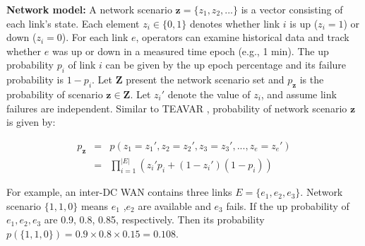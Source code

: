 \documentclass[sigconf]{acmart}
\begin{document}
\textbf{Network  model:} 
A network scenario $\bm{z}=\{z_1,z_2,...\}$ is a vector consisting of each link's state.
Each element $z_i \in \{0,1\}$ denotes whether link  $i$  is up ($z_i=1$) or down  ($z_i=0$).
For each link $e$, operators can examine historical data and track whether $e$ was up or down in a measured time epoch (e.g., 1 min).
The up probability $p_i$ of link $i$ can be given by the up epoch percentage and its failure probability is $1-p_i$.
Let $\bm{Z}$ present the network scenario set and $p_{\bm{z}}$ is the probability of scenario $\bm{z}\in \bm{Z}$.
Let $z_i'$ denote the value of $z_i$, and assume link failures are independent.
Similar to TEAVAR \cite{Teavar},  probability of network scenario  $\bm{z}$ is given by:

\begin{eqnarray} \label{state}
p_{\bm{z}}&=&p\left( z_1=z_1',z_2=z_2',z_3=z_3',...,z_{e}=z_{e}'\right)\nonumber \\
&=&\prod_{i=1}^{|E|}(z_i'p_i+(1-z_i')(1-p_i))
\end{eqnarray}

For example, an inter-DC WAN contains three links $E=\{e_1,e_2,e_3\}$. 
Network scenario $\{1,1,0\}$ means $e_1$ ,$e_2$ are available and  $e_3$ fails.
If the up probability of $e_1,e_2,e_3$ are 0.9, 0.8, 0.85, respectively.
Then its probability $p(\{1,1,0\}) =0.9\times0.8\times0.15=0.108$.
\end{document}
